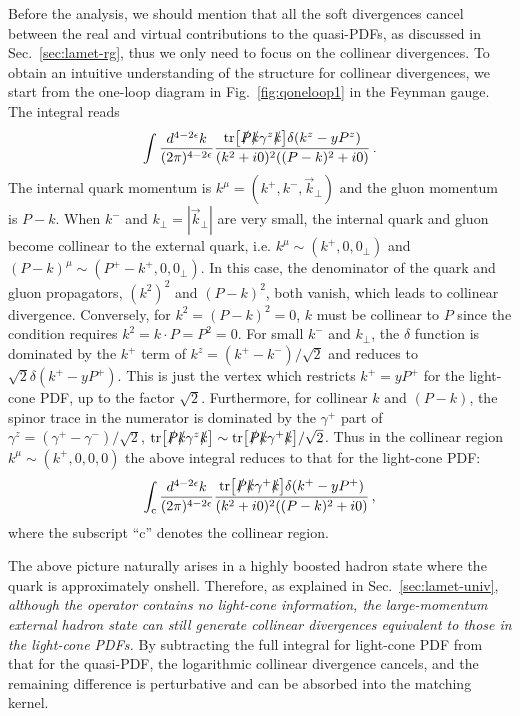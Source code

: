 \documentclass[aps,rmp,reprint,amsmath,amssymb,graphicx,longbibliography]{revtex4-1} %
\DeclareRobustCommand{\sec}[1]{Sec.~\ref{sec:#1}}
\DeclareRobustCommand{\fig}[1]{Fig.~\ref{fig:#1}}
\begin{document}
Before the analysis, we should mention that all the soft divergences cancel between the real and virtual contributions to the quasi-PDFs, as discussed in \sec{lamet-rg}, thus we only need to focus on the collinear divergences. To obtain an intuitive understanding of the structure for collinear divergences, we start from the one-loop diagram in \fig{qoneloop1} in the Feynman gauge. The integral reads
\begin{align}
	\int \frac{d^{4-2\epsilon}k}{(2\pi)^{4-2\epsilon}}\frac{{\rm tr}\big[\slashed{P}\slashed{k}\gamma^z\slashed{k}\big]\delta(k^z-yP^z)}{(k^2+i0)^2((P-k)^2+i0)}\,.
\end{align}
The internal quark momentum is $k^\mu = (k^+,k^-,\vec{k}_\perp)$ and the gluon momentum is $P-k$. When $k^-$ and $k_\perp=|\vec{k}_\perp|$ are very small, the internal quark and gluon become collinear to the external quark, i.e. $k^{\mu}\sim (k^+,0,0_\perp)$ and $(P-k)^{\mu}\sim (P^+-k^+,0,0_\perp)$. In this case, the denominator of the quark and gluon propagators, $(k^2)^2$ and $(P-k)^2$, both vanish, which leads to collinear divergence. Conversely, for $k^2=(P-k)^2=0$, $k$ must be collinear to $P$ since the condition requires $k^2=k\cdot P=P^2=0$. For small $k^-$ and $k_\perp$, the $\delta$ function is dominated by the $k^+$ term of $k^z=(k^+-k^-)/\sqrt{2}$ and reduces to $\sqrt{2}\delta(k^+-yP^+)$. This is just the vertex which restricts $k^+=yP^+$ for the light-cone PDF, up to the factor $\sqrt{2}$. Furthermore, for collinear $k$ and $(P-k)$, the spinor trace in the numerator is dominated by the $\gamma^+$ part of $\gamma^z=(\gamma^+-\gamma^-)/\sqrt{2}$, ${\rm tr}\big[\slashed{P}\slashed{k}\gamma^z\slashed{k}\big] \sim {\rm tr}\big[\slashed{P}\slashed{k}\gamma^+\slashed{k}\big]/\sqrt{2}$. Thus in the collinear region $k^{\mu}\sim (k^+,0,0,0)$ the above integral reduces to that for the light-cone PDF:
\begin{align}
	\int_{\rm c} \frac{d^{4-2\epsilon}k}{(2\pi)^{4-2\epsilon}}\frac{{\rm tr}\big[\slashed{P}\slashed{k}\gamma^+\slashed{k}\big]\delta(k^+-yP^+) }{(k^2+i0)^2((P-k)^2+i0)}\,,
\end{align}
where the subscript ``c'' denotes the collinear region.

The above picture naturally arises in a highly boosted hadron state where the quark is approximately onshell.
Therefore, as explained in \sec{lamet-univ},  {\it although the operator contains no light-cone information, the large-momentum external hadron state can still generate collinear divergences equivalent to those in the light-cone PDFs.} By subtracting the full integral for light-cone PDF from that for the quasi-PDF, the logarithmic collinear divergence cancels, and the remaining difference is perturbative and can be absorbed into the matching kernel.
\end{document}
